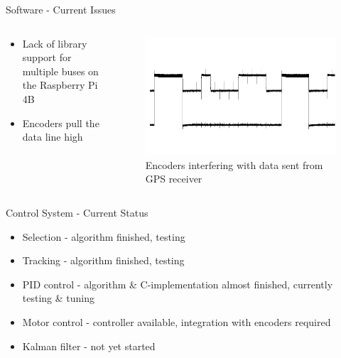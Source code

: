 \documentclass[11pt, aspectratio=169]{beamer}
\begin{document}
\begin{frame}[c]{Software - Current Issues}
    \begin{columns}[t]
        \begin{column}{.4\textwidth}
            \begin{itemize}
                \item Lack of library support for multiple buses on the Raspberry Pi 4B
                \item Encoders pull the data line high
            \end{itemize}
        \end{column}
        
        \begin{column}{.6\textwidth}
            \begin{figure}[H]
                \includegraphics[width=\textwidth]{software/encoder_gps_bus.png}
                \caption{Encoders interfering with data sent from GPS receiver}
            \end{figure}
        \end{column}
    \end{columns}
\end{frame}


\begin{frame}[c]{Control System - Current Status}
    \begin{itemize}
        \item Selection - algorithm finished, testing
        \item Tracking - algorithm finished, testing
        \item PID control - algorithm \& C-implementation almost finished, currently testing \& tuning
        \item Motor control - controller available, integration with encoders required
        \item Kalman filter - not yet started
    \end{itemize}
\end{frame}
\end{document}
